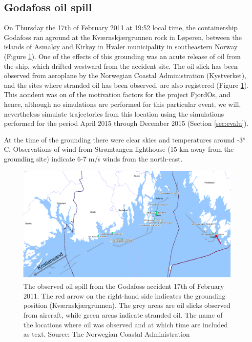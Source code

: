 \subsection{Godafoss oil spill}
\label{sect:godafoss_obs}
On Thursday the 17th of February 2011 at 19:52 local time, the containership Godafoss ran aground at the Kv{\ae}rnskj{\ae}rgrunnen rock in L{\o}peren, between the islands of Asmal{\o}y and Kirk{\o}y in Hvaler municipality in southeastern Norway (Figure \ref{fig:godafoss_oil}). One of the effects of this grounding was an acute release of oil from the ship, which drifted westward from the accident site. The oil slick has been observed from aeroplane by the Norwegian Coastal Administration (Kystverket), and the sites where stranded oil has been observed, are also registered (Figure \ref{fig:godafoss_oil}). This accident was on of the motivation factors for the project FjordOs, and hence, although no simulations are performed for this particular event, we will, nevertheless simulate trajectories from this location using the simulations performed for the period April 2015 through December 2015 (Section \ref{sec:evalu}). 

At the time of the grounding there were clear skies and temperatures around -3$^o$C. Observations of wind from Str{\o}mtangen lighthouse (15 km away from the grounding site) indicate 6-7 m/s winds from the north-east.

\begin{figure}[htb]
	\centerline{ \includegraphics*[width=1.0\textwidth]{Figurer/Godafoss} }
	\caption{\small The observed oil spill from the Godafoss accident 17th of February 2011. The red arrow on the right-hand side indicates the grounding position (Kv{\ae}rnskj{\ae}rgrunnen). The grey areas are oil slicks observed from aircraft, while green areas indicate stranded oil. The name of the locations where oil was observed and at which time are included as text. Source: The Norwegian Coastal Administration}
	\label{fig:godafoss_oil}
\end{figure}

